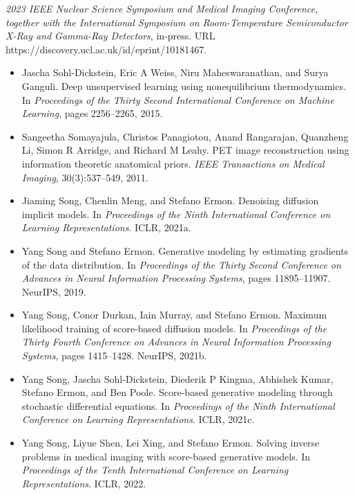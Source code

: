 \documentclass{article}
\begin{document}
\textit{2023 IEEE Nuclear Science Symposium and Medical Imaging Conference, together with the International Symposium on Room-Temperature Semiconductor X-Ray and Gamma-Ray Detectors}, in-press. URL https://discovery.ucl.ac.uk/id/eprint/10181467.
\begin{itemize}
\item 
Jascha Sohl-Dickstein, Eric A Weiss, Niru Maheswaranathan, and Surya Ganguli. Deep unsupervised learning using nonequilibrium thermodynamics. In \textit{Proceedings of the Thirty Second International Conference on Machine Learning}, pages 2256–2265, 2015.

\item 
Sangeetha Somayajula, Christos Panagiotou, Anand Rangarajan, Quanzheng Li, Simon R Arridge, and Richard M Leahy. PET image reconstruction using information theoretic anatomical priors. \textit{IEEE Transactions on Medical Imaging}, 30(3):537–549, 2011.

\item 
Jiaming Song, Chenlin Meng, and Stefano Ermon. Denoising diffusion implicit models. In \textit{Proceedings of the Ninth International Conference on Learning Representations}. ICLR, 2021a.

\item 
Yang Song and Stefano Ermon. Generative modeling by estimating gradients of the data distribution. In \textit{Proceedings of the Thirty Second Conference on Advances in Neural Information Processing Systems}, pages 11895–11907. NeurIPS, 2019.

\item 
Yang Song, Conor Durkan, Iain Murray, and Stefano Ermon. Maximum likelihood training of score-based diffusion models. In \textit{Proceedings of the Thirty Fourth Conference on Advances in Neural Information Processing Systems}, pages 1415–1428. NeurIPS, 2021b.

\item 
Yang Song, Jascha Sohl-Dickstein, Diederik P Kingma, Abhishek Kumar, Stefano Ermon, and Ben Poole. Score-based generative modeling through stochastic differential equations. In \textit{Proceedings of the Ninth International Conference on Learning Representations}. ICLR, 2021c.

\item 
Yang Song, Liyue Shen, Lei Xing, and Stefano Ermon. Solving inverse problems in medical imaging with score-based generative models. In \textit{Proceedings of the Tenth International Conference on Learning Representations}. ICLR, 2022.


\end{itemize}
\end{document}
